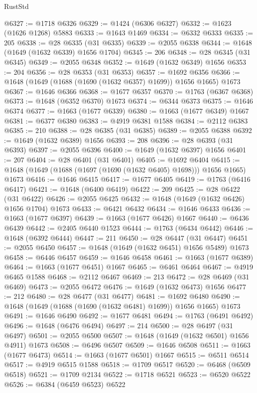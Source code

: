 \begin{lexlean}{RustStd}
\begin{coremodule}
{\begin{coremodule}
{{{{{{{{{{{{{{{{{{{{{{{{{{{{{{{{{{{{{{{{{{{{@6327 := @1718 @6326
@6329 := @1424 (@6306 @6327)
@6332 := @1623 (@1626 @1268) @5883
@6333 := @1643 @1469
@6334 := @6332 @6333
@6335 := 205
@6338 := @28 @6335 (@31 @6335)
@6339 := @2055 @6338
@6344 := @1648 (@1649 (@1632 @6339) @1656 @1704)
@6345 := 206
@6348 := @28 @6345 (@31 @6345)
@6349 := @2055 @6348
@6352 := @1649 (@1632 @6349) @1656
@6353 := 204
@6356 := @28 @6353 (@31 @6353)
@6357 := @1692 @6356
@6366 := @1648 (@1649 (@1688 (@1690 (@1632 @6357) @1699)) @1656 @1665) @1673
@6367 := @1646 @6366
@6368 := @1677 @6357
@6370 := @1763 (@6367 @6368)
@6373 := @1648 (@6352 @6370) @1673
@6374 := @6344 @6373
@6375 := @1646 @6374
@6377 := @1663 (@1677 @6339)
@6380 := @1663 (@1677 @6349) @1667
@6381 := @6377 @6380
@6383 := @4919 @6381 @1588
@6384 := @2112 @6383
@6385 := 210
@6388 := @28 @6385 (@31 @6385)
@6389 := @2055 @6388
@6392 := @1649 (@1632 @6389) @1656
@6393 := 208
@6396 := @28 @6393 (@31 @6393)
@6397 := @2055 @6396
@6400 := @1649 (@1632 @6397) @1656
@6401 := 207
@6404 := @28 @6401 (@31 @6401)
@6405 := @1692 @6404
@6415 := @1648 (@1649 (@1688 (@1697 (@1690 (@1632 @6405) @1698))) @1656 @1665) @1673
@6416 := @1646 @6415
@6417 := @1677 @6405
@6419 := @1763 (@6416 @6417)
@6421 := @1648 (@6400 @6419)
@6422 := 209
@6425 := @28 @6422 (@31 @6422)
@6426 := @2055 @6425
@6432 := @1648 (@1649 (@1632 @6426) @1656 @1704) @1673
@6433 := @6421 @6432
@6434 := @1646 @6433
@6436 := @1663 (@1677 @6397)
@6439 := @1663 (@1677 @6426) @1667
@6440 := @6436 @6439
@6442 := @2405 @6440 @1523
@6444 := @1763 (@6434 @6442)
@6446 := @1648 (@6392 @6444)
@6447 := 211
@6450 := @28 @6447 (@31 @6447)
@6451 := @2055 @6450
@6457 := @1648 (@1649 (@1632 @6451) @1656 @5489) @1673
@6458 := @6446 @6457
@6459 := @1646 @6458
@6461 := @1663 (@1677 @6389)
@6464 := @1663 (@1677 @6451) @1667
@6465 := @6461 @6464
@6467 := @4919 @6465 @1588
@6468 := @2112 @6467
@6469 := 213
@6472 := @28 @6469 (@31 @6469)
@6473 := @2055 @6472
@6476 := @1649 (@1632 @6473) @1656
@6477 := 212
@6480 := @28 @6477 (@31 @6477)
@6481 := @1692 @6480
@6490 := @1648 (@1649 (@1688 (@1690 (@1632 @6481) @1699)) @1656 @1665) @1673
@6491 := @1646 @6490
@6492 := @1677 @6481
@6494 := @1763 (@6491 @6492)
@6496 := @1648 (@6476 @6494)
@6497 := 214
@6500 := @28 @6497 (@31 @6497)
@6501 := @2055 @6500
@6507 := @1648 (@1649 (@1632 @6501) @1656 @4911) @1673
@6508 := @6496 @6507
@6509 := @1646 @6508
@6511 := @1663 (@1677 @6473)
@6514 := @1663 (@1677 @6501) @1667
@6515 := @6511 @6514
@6517 := @4919 @6515 @1588
@6518 := @1709 @6517
@6520 := @6468 (@6509 @6518)
@6521 := @1709 @2134
@6522 := @1718 @6521
@6523 := @6520 @6522
@6526 := @6384 (@6459 @6523) @6522
}}}}}}}}}}}}}}}}}}}}}}}}}}}}}}}}}}}}}}}}}}}}
\end{coremodule}}
\end{coremodule}
\end{lexlean}
